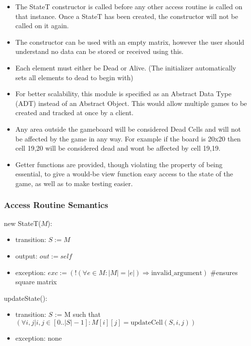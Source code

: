 \documentclass[12pt]{article}
\begin{document}
\begin{itemize}

\item The StateT constructor is called before any other access
  routine is called on that instance. Once a StateT has been created, the
  constructor will not be called on it again.

\item The constructor can be used with an empty matrix, however the user should
 understand no data can be stored or received using this.

\item Each element must either be Dead or Alive. (The initializer automatically sets all
 elements to dead to begin with)

\item For better scalability, this module is specified as an Abstract Data Type
  (ADT) instead of an Abstract Object. This would allow multiple games to be
  created and tracked at once by a client.

\item Any area outside the gameboard will be considered Dead Cells and will not be affected
by the game in any way. For example if the board is 20x20 then cell 19,20 will be considered
dead and wont be affected by cell 19,19.

\item Getter functions are provided, though violating the property of being
  essential, to give a would-be view function easy access to the state of the
  game, as well as to make testing easier.

\end{itemize}

\subsubsection* {Access Routine Semantics}

new StateT($M$):
\begin{itemize}
\item transition: $S := M$

\item output: $\mathit{out} := \mathit{self}$
\item exception: $exc := (!(\forall e \in M : |M| = |e|) \Rightarrow \text{invalid\_argument})$ \#ensures square matrix
\end{itemize}

\noindent updateState():
\begin{itemize}
  \item transition: $S$ := M such that $(\forall i,j|i,j \in [0..|S|-1]: M[i][j] = \text{updateCell}(S,i,j))$
\item exception: none
\end{itemize}
\end{document}
